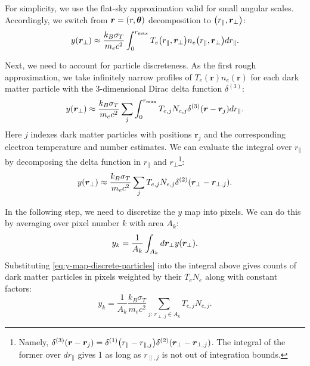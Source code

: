 For simplicity, we use the flat-sky approximation valid for small angular scales.
Accordingly, we switch from $\bm r = \qty(r, \bm \theta)$ decomposition to $\qty(r_\parallel, \bm r_\perp)$:
\begin{equation} \label{eq:y-parameter-flatsky}
    y\qty(\bm r_\perp) \approx \frac{k_B \sigma_T}{m_e c^2} \int_0^{r_{\max}} T_e\qty(r_\parallel, \bm r_\perp) n_e\qty(r_\parallel, \bm r_\perp) dr_\parallel.
\end{equation}

Next, we need to account for particle discreteness.
As the first rough approximation, we take infinitely narrow profiles of $T_e(\bm r) n_e(\bm r)$ for each dark matter particle with the 3-dimensional Dirac delta function $\delta^{(3)}$:
\begin{equation} %
    y\qty(\bm r_\perp) \approx \frac{k_B \sigma_T}{m_e c^2} \sum_j \int_0^{r_{\max}} T_{e, j} N_{e, j} \delta^{(3)}\qty(\bm r - \bm r_j) dr_\parallel.
\end{equation}
Here $j$ indexes dark matter particles with positions $\bm r_j$ and the corresponding electron temperature and number estimates.
We can evaluate the integral over $r_\parallel$ by decomposing the delta function in $r_\parallel$ and $r_\perp$\footnote{Namely, $\delta^{(3)}\qty(\bm r - \bm r_j) = \delta^{(1)}\qty(r_\parallel - r_{\parallel, j}) \delta^{(2)}\qty(\bm r_\perp - \bm r_{\perp, j})$. The integral of the former over $dr_\parallel$ gives 1 as long as $r_{\parallel, j}$ is not out of integration bounds.}:
\begin{equation} \label{eq:y-map-discrete-particles} 
    y\qty(\bm r_\perp) \approx \frac{k_B \sigma_T}{m_e c^2} \sum_j T_{e, j} N_{e, j} \delta^{(2)}\qty(\bm r_\perp - \bm r_{\perp, j}).
\end{equation}

In the following step, we need to discretize the $y$ map into pixels.
We can do this by averaging over pixel number $k$ with area $A_k$:
\begin{equation}
    y_k = \frac1{A_k} \int_{A_k} d\bm r_\perp y\qty(\bm r_\perp).
\end{equation}
Substituting \cref{eq:y-map-discrete-particles} into the integral above gives counts of dark matter particles in pixels weighted by their $T_e N_e$ along with constant factors:
\begin{equation}
    y_k = \frac1{A_k} \frac{k_B \sigma_T}{m_e c^2} \sum_{j:\, r_{\perp, j} \in A_k} T_{e, j} N_{e, j}.
\end{equation}

